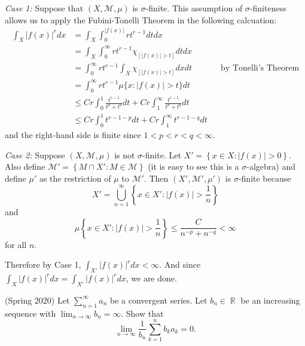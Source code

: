 \documentclass[answers]{exam}
\DeclareMathOperator{\RR}{\mathbb{R}}
\begin{document}
\begin{questions}
\begin{solution}
  \textit{Case 1:} Suppose that $(X,\mathcal{M},\mu)$ is $\sigma$-finite. This assumption of $\sigma$-finiteness allows us to apply the Fubini-Tonelli Theorem in the following calcuation:
  \begin{align*}
    \int_{X}|f(x)|^{r}dx
    &= \int_{X} \int_{0}^{|f(x)|}r t^{r-1}dt dx\\
    &=\int_{X} \int_{0}^{\infty}  rt^{r-1}\chi_{[ |f(x)|>t]}dtdx \\
    &=\int_{0}^{\infty}r t^{r-1}\int_{X} \chi_{[ |f(x)|>t]}dxdt &&\text{by Tonelli's Theorem}\\
    &=\int_{0}^{\infty}r t^{r-1}\mu\{x: |f(x)|>t\}dt\\ 
    &\leq Cr\int_{0}^{1}\frac{t^{r-1}}{t^{p}+t^{q}}dt + Cr\int_{1}^{\infty} \frac{t^{r-1}}{t^{p}+t^{q}}dt\\ 
    &\leq Cr\int_{0}^{1}t^{r-1-p}dt + Cr\int_{1}^{\infty} t^{r-1-q}dt
  \end{align*}
  and the right-hand side is finite since $1<p<r<q<\infty$.
  
  \textit{Case 2:} Suppose $(X,\mathcal{M},\mu)$ is not $\sigma$-finite. Let $X'= \left\{ x\in X: |f(x)|>0 \right\}$. Also define $\mathcal{M}'=\left\{ M\cap X' : M\in \mathcal{M} \right\}$ (it is easy to see this is a $\sigma$-algebra) and define $\mu'$ as the restriction of $\mu$ to $\mathcal{M}'$. Then $(X',\mathcal{M}',\mu')$ is $\sigma$-finite because
  \begin{equation*}
    X'= \bigcup_{n=1}^{\infty}\left\{ x\in X': |f(x)|>\frac{1}{n} \right\}
  \end{equation*}
  and 
  \begin{equation*}
    \mu\left\{ x\in X': |f(x)|>\frac{1}{n} \right\} \leq \frac{C}{n^{-p}+n^{-q}}<\infty
  \end{equation*}
  for all $n$.

  Therefore by Case 1, $\int_{X'}|f(x)|^{r}dx<\infty$. And since $\int_{X}|f(x)|^{r}dx = \int_{X'}|f(x)|^{r}dx$, we are done. 
  \end{solution}

\question (Spring 2020)
Let $\sum_{n=1}^{\infty}a_{n}$ be a convergent series. Let $b_{n}\in\RR$ be an increasing sequence with $\lim_{n\to\infty}b_{n}=\infty$. Show that
\begin{equation*}
  \lim_{n\to\infty} \frac{1}{b_{n}}\sum_{k=1}^{n}b_{k}a_{k} = 0.
\end{equation*}


\end{questions}
\end{document}
